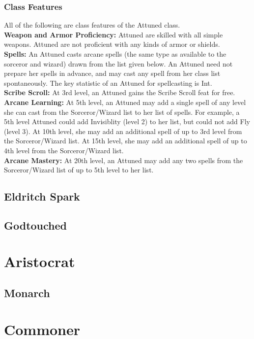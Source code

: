 \documentclass[11pt]{report}
\begin{document}
\subsubsection{Class Features}
All of the following are class features of the Attuned class. \\
\textbf{Weapon and Armor Proficiency:} Attuned are skilled with all simple
weapons. Attuned are not proficient with any kinds of armor or shields. \\
\textbf{Spells:} An Attuned casts arcane spells (the same type as available to
the sorceror and wizard) drawn from the list given below. An Attuned need not
prepare her spells in advance, and may cast any spell from her class list
spontaneously. The key statistic of an Attuned for spellcasting is Int. \\
\textbf{Scribe Scroll:} At 3rd level, an Attuned gains the Scribe Scroll feat
for free. \\
\textbf{Arcane Learning:} At 5th level, an Attuned may add a single spell of any
level she can cast from the Sorceror/Wizard list to her list of spells. For
example, a 5th level Attuned could add Invisiblity (level 2) to her list, but could not
add Fly (level 3). At 10th level, she may add an additional spell of up to 3rd
level from the Sorceror/Wizard list. At 15th level, she may add an additional
spell of up to 4th level from the Sorceror/Wizard list. \\
\textbf{Arcane Mastery:} At 20th level, an Attuned may add any two spells from
the Sorceror/Wizard list of up to 5th level to her list.

\subsection{Eldritch Spark}
\subsection{Godtouched}

\section{Aristocrat}
\subsection{Monarch}

\section{Commoner}
\end{document}
